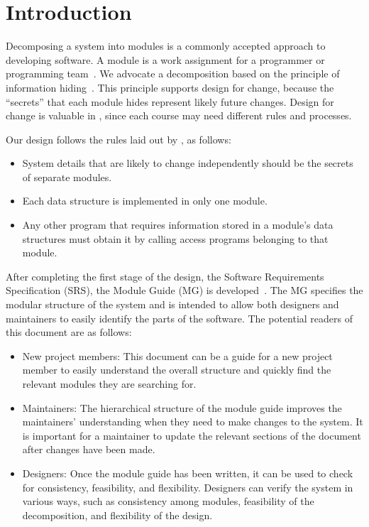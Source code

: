 \documentclass[12pt, titlepage]{article}
\begin{document}
\newpage

\tableofcontents

\listoftables

\listoffigures

\newpage


\section{Introduction}

Decomposing a system into modules is a commonly accepted approach to developing
software.  A module is a work assignment for a programmer or programming
team~\citep{ParnasEtAl1984}.  We advocate a decomposition
based on the principle of information hiding~\citep{Parnas1972a}.  This
principle supports design for change, because the ``secrets'' that each module
hides represent likely future changes.  Design for change is valuable in \projname{},
since each course may need different rules and processes.  

Our design follows the rules laid out by \citet{ParnasEtAl1984}, as follows:
\begin{itemize}
\item System details that are likely to change independently should be the
  secrets of separate modules.
\item Each data structure is implemented in only one module.
\item Any other program that requires information stored in a module's data
  structures must obtain it by calling access programs belonging to that module.
\end{itemize}

After completing the first stage of the design, the Software Requirements
Specification (SRS), the Module Guide (MG) is developed~\citep{ParnasEtAl1984}. The MG
specifies the modular structure of the system and is intended to allow both
designers and maintainers to easily identify the parts of the software.  The
potential readers of this document are as follows:

\begin{itemize}
\item New project members: This document can be a guide for a new project member
  to easily understand the overall structure and quickly find the
  relevant modules they are searching for.
\item Maintainers: The hierarchical structure of the module guide improves the
  maintainers' understanding when they need to make changes to the system. It is
  important for a maintainer to update the relevant sections of the document
  after changes have been made.
\item Designers: Once the module guide has been written, it can be used to
  check for consistency, feasibility, and flexibility. Designers can verify the
  system in various ways, such as consistency among modules, feasibility of the
  decomposition, and flexibility of the design.
\end{itemize}
\end{document}
